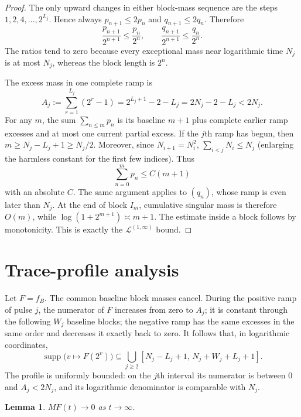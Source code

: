 \documentclass[11pt]{article}
\newtheorem{lemma}{Lemma}
\newcommand{\Mideal}{\mathcal L^{(1,\infty)}}
\begin{document}
\begin{proof}
The only upward changes in either block-mass sequence are the steps
$1,2,4,\ldots,2^{L_j}$.  Hence always
$p_{n+1}\le2p_n$ and $q_{n+1}\le2q_n$.  Therefore
\[
 \frac{p_{n+1}}{2^{n+1}}\le\frac{p_n}{2^n},\qquad
 \frac{q_{n+1}}{2^{n+1}}\le\frac{q_n}{2^n}.
\]
The ratios tend to zero because every exceptional mass near logarithmic
time $N_j$ is at most $N_j$, whereas the block length is $2^n$.

The excess mass in one complete ramp is
\begin{equation}\label{eq:A}
 A_j:=\sum_{r=1}^{L_j}(2^r-1)
     =2^{L_j+1}-2-L_j=2N_j-2-L_j<2N_j.
\end{equation}
For any $m$, the sum $\sum_{n\le m}p_n$ is its baseline $m+1$ plus
complete earlier ramp excesses and at most one current partial excess.
If the $j$th ramp has begun, then $m\ge N_j-L_j+1\ge N_j/2$.
Moreover, since $N_{i+1}=N_i^2$,
$\sum_{i<j}N_i\le N_j$ (enlarging the harmless constant for the first
few indices).  Thus
\[
 \sum_{n=0}^m p_n\le C(m+1)
\]
with an absolute $C$.  The same argument applies to $(q_n)$, whose ramp is
even later than $N_j$.  At the end of block $I_m$, cumulative singular mass
is therefore $O(m)$, while $\log(1+2^{m+1})\asymp m+1$.  The estimate inside
a block follows by monotonicity.  This is exactly the $\Mideal$ bound.
\end{proof}

\section{Trace-profile analysis}

Let $F=f_B$.  The common baseline block masses cancel.  During the positive
ramp of pulse $j$, the numerator of $F$ increases from zero to $A_j$; it is
constant through the following $W_j$ baseline blocks; the negative ramp has
the same excesses in the same order and decreases it exactly back to zero.
It follows that, in logarithmic coordinates,
\begin{equation}\label{eq:support}
 \operatorname{supp}\bigl(v\mapsto F(2^v)\bigr)
 \subseteq
 \bigcup_{j\ge2}
 [N_j-L_j+1,\,N_j+W_j+L_j+1].
\end{equation}
The profile is uniformly bounded: on the $j$th interval its numerator is
between $0$ and $A_j<2N_j$, and its logarithmic denominator is comparable
with $N_j$.

\begin{lemma}\label{lem:CD}
$MF(t)\to0$ as $t\to\infty$.
\end{lemma}
\end{document}
